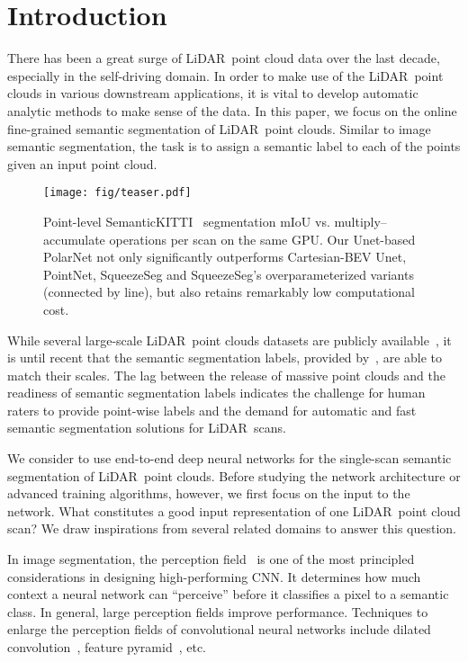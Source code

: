 \documentclass[10pt,twocolumn,letterpaper]{article}
\newcommand{\lidar}{\mbox{LiDAR }}
\begin{document}
\section{Introduction}
There has been a great surge of \lidar point cloud data over the last decade, especially in the self-driving domain. In order to make use of the \lidar point clouds in various downstream applications, it is vital to develop automatic analytic methods to make sense of the data. In this paper, we focus on the online fine-grained semantic segmentation of \lidar point clouds. Similar to image semantic segmentation, the task is to assign a semantic label to each of the points given an input point cloud. 

\begin{figure}
    \centering
    \texttt{[image: fig/teaser.pdf]}
    \caption{Point-level SemanticKITTI~\cite{behley2019iccv} segmentation mIoU vs.  multiply–accumulate operations per scan on the same GPU. Our Unet-based PolarNet not only significantly outperforms Cartesian-BEV Unet, PointNet, SqueezeSeg and SqueezeSeg's overparameterized variants (connected by line), but also retains remarkably low computational cost.}
    \label{fig:teaser}
    \vspace{-15pt}
\end{figure}

While several large-scale \lidar point clouds datasets are publicly available~\cite{geiger2012cvpr,waymo_open_dataset,zhang2015sensor,nuscenes2019}, it is until recent that the semantic segmentation labels, provided by~\cite{behley2019iccv,aev2019}, are able to match their scales. The  lag between the release of massive point clouds and the readiness of semantic segmentation labels indicates the challenge for human raters to provide point-wise labels and the demand for automatic and fast semantic segmentation solutions for  \lidar scans. 

We consider to use end-to-end deep neural networks for the single-scan semantic segmentation of \lidar point clouds. Before studying the network architecture or advanced training algorithms, however, we first focus on the input to the network. What constitutes a good input representation of one \lidar point cloud scan? We draw inspirations from several related domains to answer this question. 

In image segmentation, the perception field~\cite{YuKoltun2016} is one of the most principled considerations in designing high-performing CNN. It determines how much context a neural network can ``perceive'' before it classifies a pixel to a semantic class. In general, large perception fields improve performance. Techniques to enlarge the perception fields of  convolutional neural networks include dilated convolution~\cite{YuKoltun2016,chen2017rethinking}, feature pyramid~\cite{lin2017feature}, etc.
\end{document}
